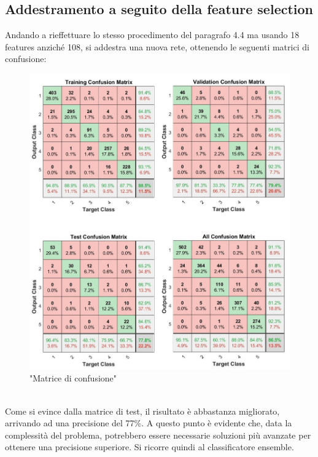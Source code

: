 \documentclass[a4paper,11pt]{article}
\begin{document}
    \subsection{Addestramento a seguito della feature selection}
    Andando a rieffettuare lo stesso procedimento del paragrafo 4.4 ma usando 18 features anziché 108, si addestra una nuova rete, ottenendo le seguenti matrici di confusione:
    \begin{figure}[h]
        \centering
        \includegraphics[scale=0.5]{confusion2}
        \caption{"Matrice di confusione"}
    \end{figure}
    \\Come si evince dalla matrice di test, il risultato è abbastanza migliorato, arrivando ad una precisione del 77\%.
    A questo punto è evidente che, data la complessità del problema, potrebbero essere necessarie soluzioni più avanzate per ottenere una precisione superiore. 
    Si ricorre quindi al classificatore ensemble.
\end{document}
